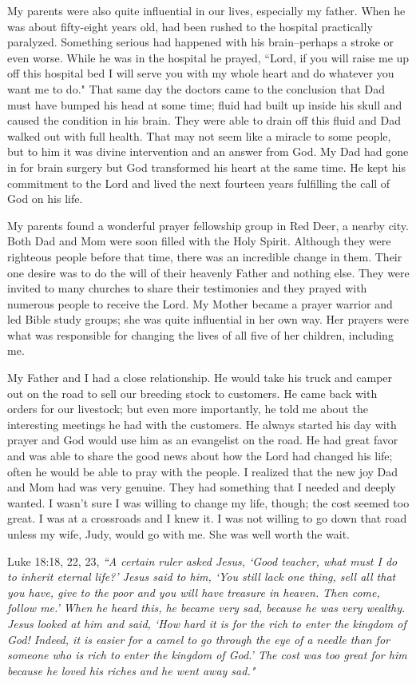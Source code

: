 \documentclass[oneside,12pt]{book}
\begin{document}
My parents were also quite influential in our lives, especially my father. When he was about fifty-eight years old, had been rushed to the hospital practically paralyzed. Something serious had happened with his brain--perhaps a stroke or even worse. While he was in the hospital he prayed, ``Lord, if you will raise me up off this hospital bed I will serve you with my whole heart and do whatever you want me to do." That same day the doctors came to the conclusion that Dad must have bumped his head at some time; fluid had built up inside his skull and caused the condition in his brain. They were able to drain off this fluid and Dad walked out with full health. That may not seem like a miracle to some people, but to him it was divine intervention and an answer from God. My Dad had gone in for brain surgery but God transformed his heart at the same time. He kept his commitment to the Lord and lived the next fourteen years fulfilling the call of God on his life.

My parents found a wonderful prayer fellowship group in Red Deer, a nearby city. Both Dad and Mom were soon filled with the Holy Spirit. Although they were righteous people before that time, there was an incredible change in them. Their one desire was to do the will of their heavenly Father and nothing else. They were invited to many churches to share their testimonies and they prayed with numerous people to receive the Lord. My Mother became a prayer warrior and led Bible study groups; she was quite influential in her own way. Her prayers were what was responsible for changing the lives of all five of her children, including me.

My Father and I had a close relationship. He would take his truck and camper out on the road to sell our breeding stock to customers. He came back with orders for our livestock; but even more importantly, he told me about the interesting meetings he had with the customers. He always started his day with prayer and God would use him as an evangelist on the road. He had great favor and was able to share the good news about how the Lord had changed his life; often he would be able to pray with the people. I realized that the new joy Dad and Mom had was very genuine. They had something that I needed and deeply wanted. I wasn't sure I was willing to change my life, though; the cost seemed too great. I was at a crossroads and I knew it. I was not willing to go down that road unless my wife, Judy, would go with me. She was well worth the wait.

Luke 18:18, 22, 23,  \textit{``A certain ruler asked Jesus, `Good teacher, what must I do to inherit eternal life?' Jesus said to him, `You still lack one thing, sell all that you have, give to the poor and you will have treasure in heaven. Then come, follow me.' When he heard this, he became very sad, because he was very wealthy. Jesus looked at him and said, `How hard it is for the rich to enter the kingdom of God! Indeed, it is easier for a camel to go through the eye of a needle than for someone who is rich to enter the kingdom of God.' The cost was too great for him because he loved his riches and he went away sad."}
\end{document}
